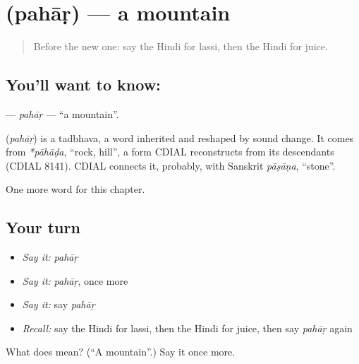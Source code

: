 \section[\texorpdfstring{\hi{पहाड़} (pahāṛ)}{पहाड़ (pahāṛ)}]{ (pahāṛ) — a mountain}

\label{lesson:HI-C142-pahar}



\begin{quote}
Before the new one: say the Hindi for lassi, then the Hindi for juice.
\end{quote}

\subsection*{You'll want to know: }
\textbf{} — \emph{pahāṛ} — \textquotedblleft{}a mountain\textquotedblright{}.

\begin{cousinweb}
\textbf{} (\emph{pahāṛ}) is a tadbhava, a word inherited and reshaped by sound change. It comes from \emph{*pāhāḍa}, \textquotedblleft{}rock, hill\textquotedblright{}, a form CDIAL reconstructs from its descendants (CDIAL 8141). CDIAL connects it, probably, with Sanskrit \emph{pāṣāṇa}, \textquotedblleft{}stone\textquotedblright{}.
\end{cousinweb}

\begin{grammarlens}[title={What you've built}]
One more word for this chapter.
\end{grammarlens}

\subsection*{Your turn}
\begin{itemize}
\raggedright
  \item \emph{Say it:} \emph{pahāṛ}
  \item \emph{Say it:} \emph{pahāṛ}, once more
  \item \emph{Say it:} say \emph{pahāṛ}
  \item \emph{Recall:} say the Hindi for lassi, then the Hindi for juice, then say \emph{pahāṛ} again
\end{itemize}

\begin{tcolorbox}[breakable,colback=teal!4,colframe=teal!35!black,title={Before you move on}]
What does  mean? (\textquotedblleft{}A mountain\textquotedblright{}.) Say it once more.
\end{tcolorbox}
